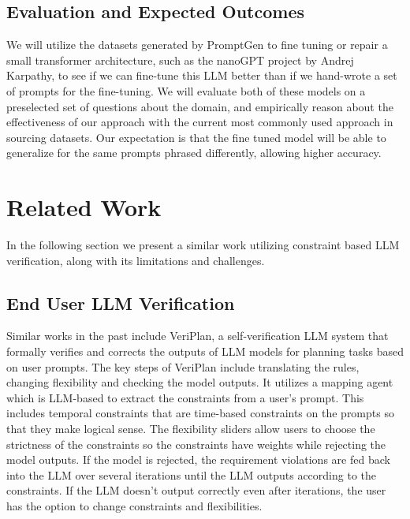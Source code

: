 \documentclass{article}
\begin{document}
\subsection{Evaluation and Expected Outcomes}
We will utilize the datasets generated by PromptGen to fine tuning or repair a small transformer architecture, such as the nanoGPT project by Andrej Karpathy, to see if we can fine-tune this LLM better than if we hand-wrote a set of prompts for the fine-tuning. We will evaluate both of these models on a preselected set of questions about the domain, and empirically reason about the effectiveness of our approach with the current most commonly used approach in sourcing datasets.  Our expectation is that the fine tuned model will be able to generalize for the same prompts phrased differently, allowing higher accuracy.

\section{Related Work}
\label{gen_inst}

In the following section we present a similar work utilizing constraint based LLM verification, along with its limitations and challenges.

\subsection{End User LLM Verification}


Similar works in the past include VeriPlan, a self-verification LLM system that formally verifies and corrects the outputs of LLM models for planning tasks based on user prompts.  The key steps of VeriPlan include translating the rules, changing flexibility and checking the model outputs.  It utilizes a mapping agent which is LLM-based to extract the constraints from a user’s prompt.  This includes temporal constraints that are time-based constraints on the prompts so that they make logical sense.  The flexibility sliders allow users to choose the strictness of the constraints so the constraints have weights while rejecting the model outputs.  If the model is rejected, the requirement violations are fed back into the LLM over several iterations until the LLM outputs according to the constraints.  If the LLM doesn’t output correctly even after iterations, the user has the option to change constraints and flexibilities.
\end{document}
